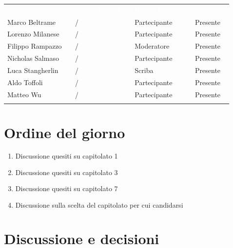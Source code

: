 \documentclass[12pt,a4paper]{article}
\newcommand{\tightlist}{\setlength{\itemsep}{1pt}\setlength{\parskip}{0pt}}
\begin{document}
\begin{center}
\begin{tabularx}{\linewidth}{>{\hsize=1.2\hsize\raggedright\arraybackslash}X>{\hsize=1.0\hsize\centering\arraybackslash}X>{\hsize=1.0\hsize\centering\arraybackslash}X>{\hsize=0.8\hsize\centering\arraybackslash}X}
\rowcolor{bfblue}\textcolor{white}{\textbf{Nome e Cognome}} & \textcolor{white}{\textbf{Ruolo Progetto}} & \textcolor{white}{\textbf{Ruolo Riunione}} & \textcolor{white}{\textbf{Presenza}} \\
Marco Beltrame & / & Partecipante &  Presente \\ \arrayrulecolor{bfline}\hline
Lorenzo Milanese & / & Partecipante &  Presente \\ \arrayrulecolor{bfline}\hline
Filippo Rampazzo & / &  Moderatore &  Presente \\ \arrayrulecolor{bfline}\hline
Nicholas Salmaso & / & Partecipante &  Presente \\ \arrayrulecolor{bfline}\hline
Luca Stangherlin & / & Scriba &  Presente \\ \arrayrulecolor{bfline}\hline
Aldo Toffoli & / & Partecipante &  Presente \\ \arrayrulecolor{bfline}\hline
Matteo Wu & / & Partecipante &  Presente \\ \arrayrulecolor{bfline}\hline
\end{tabularx}
\end{center}



\hypertarget{ordine-del-giorno}{%
\section{Ordine del giorno}}

\begin{enumerate}
\tightlist
\item {Discussione quesiti su capitolato 1}
\item {Discussione quesiti su capitolato 3}
\item {Discussione quesiti su capitolato 7}
\item {Discussione sulla scelta del capitolato per cui candidarsi}
\end{enumerate}

\hypertarget{discussione-e-decisioni}{%
\section{Discussione e decisioni}}
\end{document}
